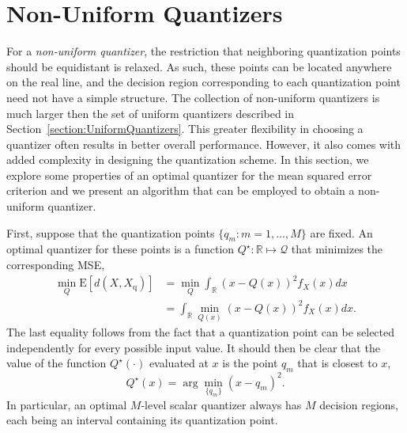 \section{Non-Uniform Quantizers}
\label{section:NonUniformQuantizers}

For a \emph{non-uniform quantizer}, the restriction that neighboring quantization points should be equidistant is relaxed.
As such, these points can be located anywhere on the real line, and the decision region corresponding to each quantization point need not have a simple structure.
The collection of non-uniform quantizers is much larger then the set of uniform quantizers described in Section~\ref{section:UniformQuantizers}.
This greater flexibility in choosing a quantizer often results in better overall performance.
However, it also comes with added complexity in designing the quantization scheme.
In this section, we explore some properties of an optimal quantizer for the mean squared error criterion and we present an algorithm that can be employed to obtain a non-uniform quantizer.

First, suppose that the quantization points $\{ q_m : m = 1, \ldots, M \}$ are fixed.
An optimal quantizer for these points is a function $Q^{\star} : \mathbb{R} \mapsto \mathcal{Q}$ that minimizes the corresponding MSE,
\begin{equation*}
\begin{split}
\min_Q \mathrm{E} [ d(X, X_{\mathrm{q}}) ]
&= \min_Q \int_{\mathbb{R}} (x - Q(x))^2 f_X(x) dx \\
&= \int_{\mathbb{R}} \min_{Q(x)} (x - Q(x))^2 f_X(x) dx .
\end{split}
\end{equation*}
The last equality follows from the fact that a quantization point can be selected independently for every possible input value.
It should then be clear that the value of the function $Q^{\star}(\cdot)$ evaluated at $x$ is the point $q_m$ that is closest to $x$,
\begin{equation*}
Q^{\star}(x) = \arg \min_{\{ q_m \}} (x - q_m)^2 .
\end{equation*}
In particular, an optimal $M$-level scalar quantizer always has $M$ decision regions, each being an interval containing its quantization point.

